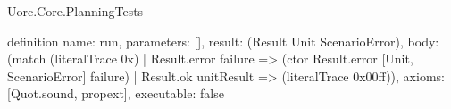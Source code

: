\begin{lexlean}{Uorc.Core.PlanningTests}
\begin{semanticmodule}
definition{
  name: run,
  parameters: [],
  result: (Result Unit ScenarioError),
  body: (match (literalTrace 0x)
    | Result.error failure => (ctor Result.error [Unit, ScenarioError] failure)
    | Result.ok unitResult => (literalTrace 0x00ff)),
  axioms: [Quot.sound, propext],
  executable: false
}
\end{semanticmodule}
\end{lexlean}
